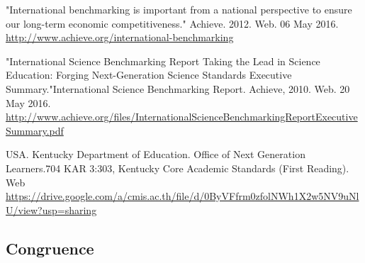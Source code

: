 \documentclass{report}
\begin{document}
\begin{evidence}
\item "International benchmarking is important from a national perspective to ensure our long-term economic competitiveness." Achieve. 2012. Web. 06 May 2016. \url{http://www.achieve.org/international-benchmarking}
\item "International Science Benchmarking Report Taking the Lead in Science Education: Forging Next-Generation Science Standards Executive Summary."International Science Benchmarking Report. Achieve, 2010. Web. 20 May 2016. \url{http://www.achieve.org/files/InternationalScienceBenchmarkingReportExecutiveSummary.pdf}
\item USA. Kentucky Department of Education. Office of Next Generation Learners.704 KAR 3:303, Kentucky Core Academic Standards (First Reading). Web \url{https://drive.google.com/a/cmis.ac.th/file/d/0ByVFfrm0zfolNWh1X2w5NV9uNlU/view?usp=sharing}
\end{evidence}

\subsection{Congruence}

\end{document}
